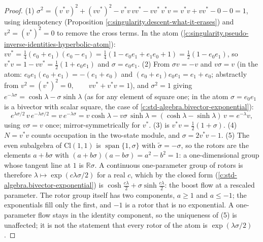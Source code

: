 \documentclass[11pt]{article}
\theoremstyle{definition}
\theoremstyle{plain}
\providecommand{\Cl}{}\renewcommand{\Cl}{\mathrm{Cl}}
\providecommand{\R}{}\renewcommand{\R}{\mathbb{R}}
\begin{document}
\begin{proof}
(1) $\sigma^2 = (v^*v)^2 + (vv^*)^2 - v^*v\,vv^* - vv^*\,v^*v = v^*v + vv^* - 0 - 0 = 1$, using idempotency (Proposition \ref{c:singularity.descent-what-it-erases}) and $v^2 = (v^*)^2 = 0$ to remove the cross terms. In the atom (\ref{c:singularity.pseudo-inverse-identities-hyperbolic-atom}): $v v^* = \tfrac14(e_0 + e_1)(e_0 - e_1) = \tfrac14(1 - e_0e_1 + e_1e_0 + 1) = \tfrac12(1 - e_0e_1)$, so $v^*v = 1 - vv^* = \tfrac12(1 + e_0e_1)$ and $\sigma = e_0 e_1$. (2) From $\sigma v = -v$ and $v\sigma = v$ (in the atom: $e_0e_1(e_0 + e_1) = -(e_1 + e_0)$ and $(e_0+e_1)e_0e_1 = e_1 + e_0$; abstractly from $v^2 = (v^*)^2 = 0, \qquad v v^* + v^* v = 1$), and $\sigma^2 = 1$ giving $e^{-\lambda\sigma} = \cosh\lambda - \sigma\sinh\lambda$ (as for any element of square one; in the atom $\sigma = e_0 e_1$ is a bivector with scalar square, the case of \ref{c:std-algebra.bivector-exponential}):
\[
e^{\lambda\sigma/2}\,v\,e^{-\lambda\sigma/2} = v\,e^{-\lambda\sigma} = v\cosh\lambda - v\sigma\,\sinh\lambda = (\cosh\lambda - \sinh\lambda)\,v = e^{-\lambda}v ,
\]
using $v\sigma = v$ once; mirror-symmetrically for $v^*$. (3) is $v^*v = \tfrac12(1 + \sigma)$. (4) $N = v^*v$ counts occupation in the two-state module, and $\sigma = 2v^*v - 1$. (5) The even subalgebra of $\Cl(1,1)$ is $\operatorname{span}\{1, \sigma\}$ with $\tilde\sigma = -\sigma$, so the rotors are the elements $a + b\sigma$ with $(a + b\sigma)(a - b\sigma) = a^2 - b^2 = 1$: a one-dimensional group whose tangent line at $1$ is $\R\sigma$. A continuous one-parameter group of rotors is therefore $\lambda \mapsto \exp(c\lambda\sigma/2)$ for a real $c$, which by the closed form (\ref{c:std-algebra.bivector-exponential}) is $\cosh\tfrac{c\lambda}{2} + \sigma\sinh\tfrac{c\lambda}{2}$: the boost flow at a rescaled parameter. The rotor group itself has two components, $a \ge 1$ and $a \le -1$; the exponentials fill only the first, and $-1$ is a rotor that is no exponential. A one-parameter flow stays in the identity component, so the uniqueness of (5) is unaffected; it is not the statement that every rotor of the atom is $\exp(\lambda\sigma/2)$.

\end{proof}
\end{document}
